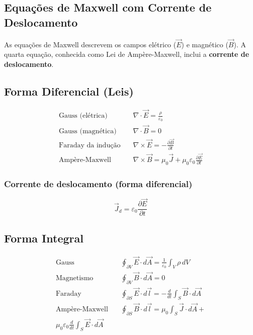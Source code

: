 \documentclass[a4paper,12pt]{article}
\begin{document}
\begin{multicols}{2}
\section{Equações de Maxwell com Corrente de Deslocamento}

As equações de Maxwell descrevem os campos elétrico ($\vec{E}$) e magnético ($\vec{B}$). A quarta equação, conhecida como Lei de Ampère-Maxwell, inclui a \textbf{corrente de deslocamento}.

\subsection*{Forma Diferencial (Leis)}

\begin{align*}
\text{Gauss (elétrica)} \quad & \nabla \cdot \vec{E} = \frac{\rho}{\varepsilon_0} \\
\text{Gauss (magnética)} \quad & \nabla \cdot \vec{B} = 0 \\
\text{Faraday da indução} \quad & \nabla \times \vec{E} = -\frac{\partial \vec{B}}{\partial t} \\
\text{Ampère-Maxwell} \quad & \nabla \times \vec{B} = \mu_0 \vec{J} + \mu_0 \varepsilon_0 \frac{\partial \vec{E}}{\partial t}
\end{align*}

\subsubsection{Corrente de deslocamento (forma diferencial)}
\[
\vec{J}_d = \varepsilon_0 \frac{\partial \vec{E}}{\partial t}
\]

\subsection{Forma Integral}

\begin{align*}
\text{Gauss} \quad & \oint_{\partial V} \vec{E} \cdot d\vec{A} = \frac{1}{\varepsilon_0} \int_V \rho \, dV \\
\text{Magnetismo} \quad & \oint_{\partial V} \vec{B} \cdot d\vec{A} = 0 \\
\text{Faraday} \quad & \oint_{\partial S} \vec{E} \cdot d\vec{l} = -\frac{d}{dt} \int_S \vec{B} \cdot d\vec{A} \\
\text{Ampère-Maxwell} \quad & \oint_{\partial S} \vec{B} \cdot d\vec{l} = \mu_0 \int_S \vec{J} \cdot d\vec{A} + \\ \mu_0 \varepsilon_0 \frac{d}{dt} \int_S \vec{E} \cdot d\vec{A}
\end{align*}


\end{multicols}
\end{document}
